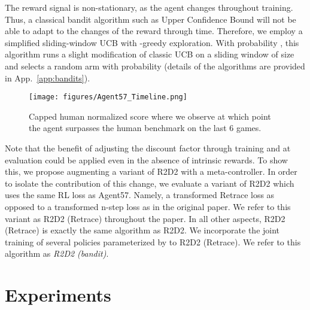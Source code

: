 \documentclass{article}
\begin{document}
The reward signal  is non-stationary, as the agent changes throughout training. 
Thus, a classical bandit algorithm such as Upper Confidence Bound \citep[UCB; ][]{garivier2008upperconfidence} will not be able to adapt to the changes of the reward through time. Therefore, we employ a simplified sliding-window UCB with -greedy exploration.
With probability , this algorithm runs a slight modification of classic UCB on a sliding window of size  and selects a random arm with probability  (details of the algorithms are provided in App.~\ref{app:bandits}). 


\begin{figure}[!t]
    \centering
    \texttt{[image: figures/Agent57\_Timeline.png]}
    \vspace{-3ex}
    \caption{Capped human normalized score where we observe at which point the agent surpasses the human benchmark on the last 6 games.} 
    \label{fig:superhuman_timeline}
    \vspace{-3ex}
\end{figure}

Note that the benefit of adjusting the discount factor through training and at evaluation could be applied even in the absence of intrinsic rewards. To show this, we propose augmenting a variant of R2D2 with a meta-controller. In order to isolate the contribution of this change, we evaluate a variant of R2D2 which uses the same RL loss as Agent57.
Namely, a transformed Retrace loss as opposed to a transformed n-step loss as in the original paper. We refer to this variant as R2D2 (Retrace) throughout the paper. In all other aspects, R2D2 (Retrace) is exactly the same algorithm as R2D2.
We incorporate the joint training of several policies parameterized by  to R2D2 (Retrace). We refer to this algorithm as \emph{R2D2 (bandit)}.

\section{Experiments}
\label{sec:experiments}
\end{document}
